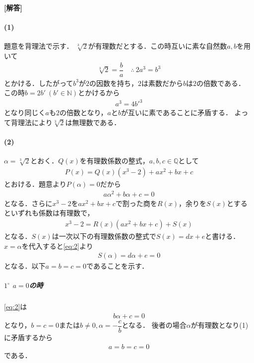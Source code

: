 \documentclass[../../main.tex]{subfiles}
\begin{document}
\begin{oframed}
  
\end{oframed}

{\bf [解答]}

\paragraph{(1)}

題意を背理法で示す．
$\sqrt[3]{2}$が有理数だとする．この時互いに素な自然数$a,b$を用いて
\begin{align}
  \sqrt[3]{2}=\dfrac{b}{a}\quad\therefore\ 2a^3=b^3
\end{align}
とかける．したがって$b^3$が$2$の因数を持ち，$2$は素数だから$b$は$2$の倍数である．
この時$b=2b'\ (b'\in\mathbb N)$とかけるから
\begin{align}
  a^3=4b'^3
\end{align}
となり同じく$a$も$2$の倍数となり，$a$と$b$が互いに素であることに矛盾する．
よって背理法により$\sqrt[3]{2}$は無理数である．

\paragraph{(2)}

$\alpha=\sqrt[3]{2}$とおく．$Q(x)$を有理数係数の整式，$a,b,c\in\mathbb{Q}$として
\begin{align}
  P(x)=Q(x)(x^3-2)+ax^2+bx+c \label{eq:1}
\end{align}
とおける．題意より$P(\alpha)=0$だから
\begin{align}
  a\alpha^2+b\alpha+c=0 \label{eq:2}
\end{align}
となる．さらに$x^3-2$を$ax^2+bx+c$で割った商を$R(x)$，余りを$S(x)$とするといずれも係数は有理数で，
\begin{align}
  x^3-2 = R(x)(ax^2+bx+c) + S(x) \label{eq:3}
\end{align}
となる．$S(x)$は一次以下の有理数係数の整式で$S(x)=dx+e$と書ける．
$x=\alpha$を代入すると\cref{eq:2}より
\begin{align}
  S(\alpha) = d\alpha + e = 0 \label{eq:4}
\end{align}
となる．以下$a=b=c=0$であることを示す．

\subparagraph{$1^{\circ}$ $a=0$の時}

\cref{eq:2}は
\begin{align}
  b\alpha + c = 0
\end{align}
となり，$b=c=0$または$b \neq 0, \alpha=-\dfrac{c}{b}$となる．
後者の場合$\alpha$が有理数となり(1)に矛盾するから
\begin{align}
  a = b = c = 0
\end{align}
である．
\end{document}
